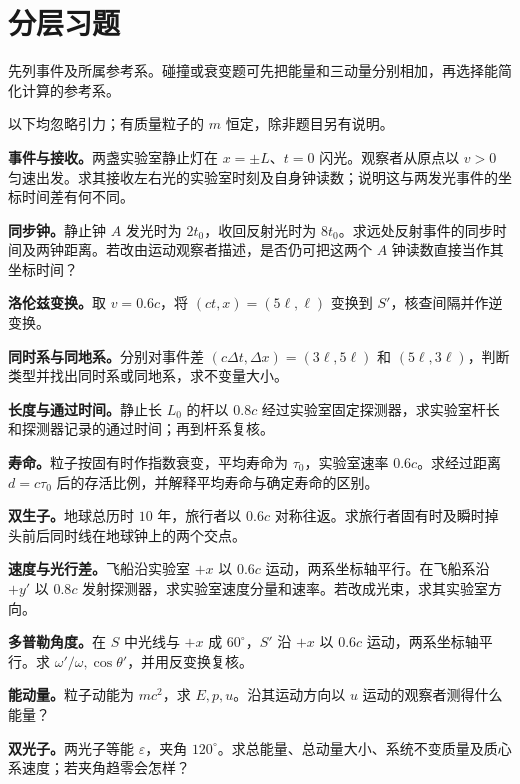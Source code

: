 \section*{分层习题}
先列事件及所属参考系。碰撞或衰变题可先把能量和三动量分别相加，再选择能简化计算的参考系。

以下均忽略引力；有质量粒子的 $m$ 恒定，除非题目另有说明。
\begin{bookexercises}
\item {} \textbf{事件与接收。}两盏实验室静止灯在 $x=\pm L$、$t=0$ 闪光。观察者从原点以 $v>0$ 匀速出发。求其接收左右光的实验室时刻及自身钟读数；说明这与两发光事件的坐标时间差有何不同。
\item {} \textbf{同步钟。}静止钟 $A$ 发光时为 $2t_0$，收回反射光时为 $8t_0$。求远处反射事件的同步时间及两钟距离。若改由运动观察者描述，是否仍可把这两个 $A$ 钟读数直接当作其坐标时间？
\item {} \textbf{洛伦兹变换。}取 $v=0.6c$，将 $(ct,x)=(5\ell,\ell)$ 变换到 $S'$，核查间隔并作逆变换。
\item {} \textbf{同时系与同地系。}分别对事件差 $(c\Delta t,\Delta x)=(3\ell,5\ell)$ 和 $(5\ell,3\ell)$，判断类型并找出同时系或同地系，求不变量大小。
\item {} \textbf{长度与通过时间。}静止长 $L_0$ 的杆以 $0.8c$ 经过实验室固定探测器，求实验室杆长和探测器记录的通过时间；再到杆系复核。
\item {} \textbf{寿命。}粒子按固有时作指数衰变，平均寿命为 $\tau_0$，实验室速率 $0.6c$。求经过距离 $d=c\tau_0$ 后的存活比例，并解释平均寿命与确定寿命的区别。
\item {} \textbf{双生子。}地球总历时 $10$ 年，旅行者以 $0.6c$ 对称往返。求旅行者固有时及瞬时掉头前后同时线在地球钟上的两个交点。
\item {} \textbf{速度与光行差。}飞船沿实验室 $+x$ 以 $0.6c$ 运动，两系坐标轴平行。在飞船系沿 $+y'$ 以 $0.8c$ 发射探测器，求实验室速度分量和速率。若改成光束，求其实验室方向。
\item {} \textbf{多普勒角度。}在 $S$ 中光线与 $+x$ 成 $60^\circ$，$S'$ 沿 $+x$ 以 $0.6c$ 运动，两系坐标轴平行。求 $\omega'/\omega,\cos\theta'$，并用反变换复核。
\item {} \textbf{能动量。}粒子动能为 $mc^2$，求 $E,p,u$。沿其运动方向以 $u$ 运动的观察者测得什么能量？
\item {} \textbf{双光子。}两光子等能 $\varepsilon$，夹角 $120^\circ$。求总能量、总动量大小、系统不变质量及质心系速度；若夹角趋零会怎样？

\end{bookexercises}

